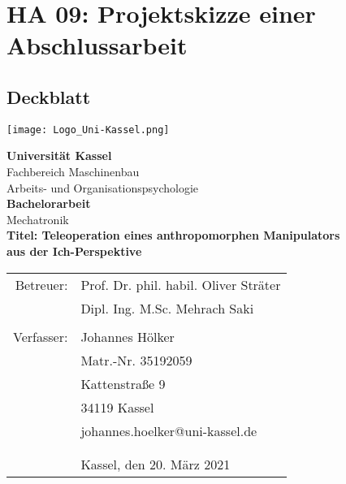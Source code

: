 \section{HA 09: Projektskizze einer Abschlussarbeit}
\subsection{Deckblatt}
\texttt{[image: Logo\_Uni-Kassel.png]}\vspace{50pt}
\begin{center}
\textbf{Universität Kassel}\\
Fachbereich Maschinenbau\\
Arbeits- und Organisationspsychologie\\\vspace{50pt}
\textbf{Bachelorarbeit}\\
Mechatronik\\\vspace{20pt}
\textbf{Titel: Teleoperation eines anthropomorphen Manipulators \\
aus der Ich-Perspektive}\\\vspace{50pt}

\begin{tabular}{rl}
Betreuer: & Prof. Dr. phil. habil. Oliver Sträter\\
 & Dipl. Ing. M.Sc. Mehrach Saki \\
  & \\
Verfasser: & Johannes Hölker\\
 & Matr.-Nr. 35192059\\
 & Kattenstraße 9\\
 & 34119 Kassel\\
 & johannes.hoelker@uni-kassel.de\\\vspace{40pt}
 & \\
 & \\
 & Kassel, den 20. März 2021\\
\end{tabular}
\end{center}
